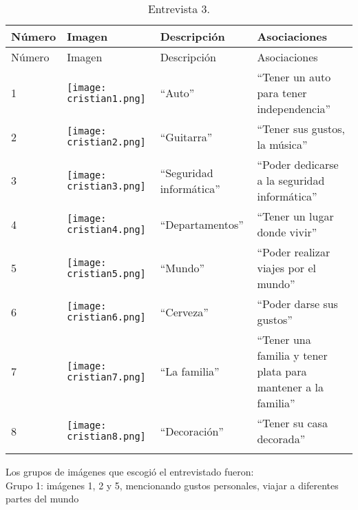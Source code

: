 \begin{longtable}{>{\centering\arraybackslash}m{1cm} >{\centering\arraybackslash}m{2cm} >{\arraybackslash}m{5cm}>{\arraybackslash}m{5cm}}
	
	\hline
	Número & Imagen & Descripción & Asociaciones \\
	\hline \hline
	\endfirsthead
	
	\hline
	Número & Imagen & Descripción & Asociaciones \\
	\hline \hline
	\endhead

1 & \texttt{[image: cristian1.png]} & ``Auto'' & ``Tener un auto para tener independencia'' \\
\hline

2 & \texttt{[image: cristian2.png]} & ``Guitarra'' & ``Tener sus gustos, la música'' \\
\hline

3 & \texttt{[image: cristian3.png]} & ``Seguridad informática'' & ``Poder dedicarse a la seguridad informática'' \\
\hline

4 & \texttt{[image: cristian4.png]} & ``Departamentos'' & ``Tener un lugar donde vivir'' \\
\hline

5 & \texttt{[image: cristian5.png]} & ``Mundo'' & ``Poder realizar viajes por el mundo''\\
\hline

6 & \texttt{[image: cristian6.png]} & ``Cerveza'' & ``Poder darse sus gustos''\\
\hline

7 & \texttt{[image: cristian7.png]} & ``La familia'' & ``Tener una familia y tener plata para mantener a la familia'' \\
\hline

8 & \texttt{[image: cristian8.png]} & ``Decoración'' & ``Tener su casa decorada''\\
\hline


\caption{Entrevista 3.}
\label{tabla:cristian}
\end{longtable}

Los grupos de imágenes que escogió el entrevistado fueron:\\

Grupo 1: imágenes 1, 2 y 5, mencionando gustos personales, viajar a diferentes partes del mundo \\

